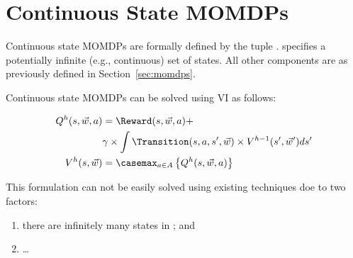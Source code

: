 
\section{Continuous State MOMDPs}

Continuous state MOMDPs are formally defined by the tuple {\footnotesize \MDPTuple}. {\footnotesize \State} specifies a potentially infinite (e.g., continuous) set of states. All other components are as previously defined in Section~\ref{sec:momdps}.

Continuous state MOMDPs can be solved using VI as follows:

{\footnotesize 
    \abovedisplayskip=0pt
    \belowdisplayskip=0pt
    \begin{align}
        Q^{h}(s, \vec{w}, a) &= \Reward(s, \vec{w}, a) + \nonumber \\
        & \gamma \times \int \Transition(s, a, s', \vec{w}) \times V^{h-1}(s', \vec{w}') ds'\label{eq:qfunc}\\
        V^{h}(s, \vec{w}) &= \casemax_{a \in A} \left\{ Q^{h}(s, \vec{w}, a) \right\} \label{eq:vfunc}
    \end{align}
}%

This formulation can not be easily solved using existing techniques doe to two factors:
\begin{enumerate}
    \item there are infinitely many states in \State; and
    \item \ldots
\end{enumerate}

